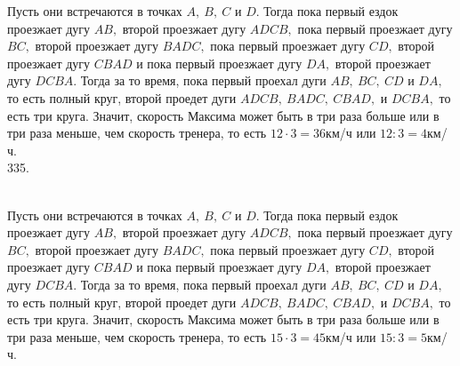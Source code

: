 \documentclass[12pt]{article}
\begin{document}
Пусть они встречаются в точках $A,\ B,\ C$ и $D.$ Тогда пока первый ездок проезжает дугу $AB,$ второй проезжает дугу $ADCB,$ пока первый проезжает дугу $BC,$ второй проезжает дугу $BADC,$ пока первый проезжает дугу $CD,$ второй проезжает дугу $CBAD$ и пока первый проезжает дугу $DA,$ второй проезжает дугу $DCBA.$ Тогда за то время, пока первый проехал дуги $AB,\ BC,\ CD$ и $DA,$ то есть полный круг, второй проедет дуги $ADCB,\ BADC,\ CBAD,$ и $DCBA,$ то есть три круга. Значит, скорость Максима может быть в три раза больше или в три раза меньше, чем скорость тренера, то есть $12\cdot3=36$км/ч или $12:3=4$км/ч.\\
335.\begin{figure}[ht!]
\end{figure}\\
Пусть они встречаются в точках $A,\ B,\ C$ и $D.$ Тогда пока первый ездок проезжает дугу $AB,$ второй проезжает дугу $ADCB,$ пока первый проезжает дугу $BC,$ второй проезжает дугу $BADC,$ пока первый проезжает дугу $CD,$ второй проезжает дугу $CBAD$ и пока первый проезжает дугу $DA,$ второй проезжает дугу $DCBA.$ Тогда за то время, пока первый проехал дуги $AB,\ BC,\ CD$ и $DA,$ то есть полный круг, второй проедет дуги $ADCB,\ BADC,\ CBAD,$ и $DCBA,$ то есть три круга. Значит, скорость Максима может быть в три раза больше или в три раза меньше, чем скорость тренера, то есть $15\cdot3=45$км/ч или $15:3=5$км/ч.\\
\end{document}

